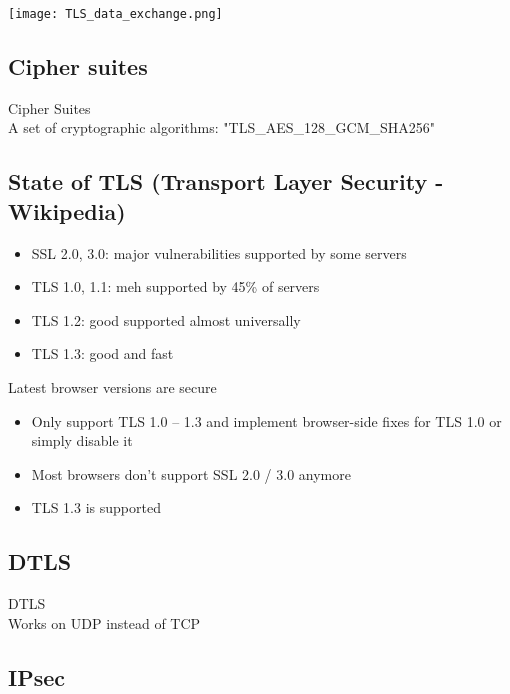 \texttt{[image: TLS\_data\_exchange.png]}

\subsection{Cipher suites}

\begin{definition}{Cipher Suites}\\
    A set of cryptographic algorithms: "TLS\_AES\_128\_GCM\_SHA256"
\end{definition}

\subsection{State of TLS (Transport Layer Security - Wikipedia)}

\begin{remark}
    \begin{itemize}
        \item SSL 2.0, 3.0: major vulnerabilities supported by some servers
        \item TLS 1.0, 1.1: meh supported by 45\% of servers
        \item TLS 1.2: good supported almost universally
        \item TLS 1.3: good and fast
    \end{itemize}
    
    Latest browser versions are secure
    \begin{itemize}
        \item Only support TLS 1.0 – 1.3 and implement browser-side fixes for TLS 1.0 or simply disable it
        \item Most browsers don't support SSL 2.0 / 3.0 anymore
        \item TLS 1.3 is supported
    \end{itemize}
\end{remark}

\subsection{DTLS}

\begin{concept}{DTLS}\\
    Works on UDP instead of TCP
\end{concept}

\subsection{IPsec}

